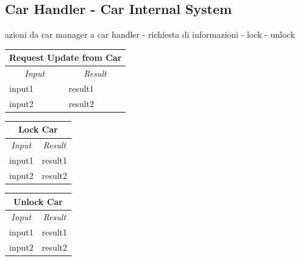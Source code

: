 \documentclass[english]{article}
\begin{document}
\subsection{Car Handler - Car Internal System}
azioni da car manager a car handler
- richiesta di informazioni
- lock
- unlock

\begin{center}

	\begin{tabular}{ | p{6cm} | p{6cm} | }
		\hline 


		\hline

		\multicolumn{2}{|c|}{\textbf{Request Update from Car}} \\
		\hline
		\multicolumn{1}{|c|}{\textit{Input}} & \multicolumn{1}{c|}{\textit{Result}} \\
		\hline
		input1 & result1 \\
		\hline
		input2 & result2 \\
		\hline
	\end{tabular}
\end{center}

\begin{center}

	\begin{tabular}{ | p{6cm} | p{6cm} | }
		\hline 


		\hline

		\multicolumn{2}{|c|}{\textbf{Lock Car}} \\
		\hline
		\multicolumn{1}{|c|}{\textit{Input}} & \multicolumn{1}{c|}{\textit{Result}} \\
		\hline
		input1 & result1 \\
		\hline
		input2 & result2 \\
		\hline
	\end{tabular}
\end{center}

\begin{center}

	\begin{tabular}{ | p{6cm} | p{6cm} | }
		\hline 


		\hline

		\multicolumn{2}{|c|}{\textbf{Unlock Car}} \\
		\hline
		\multicolumn{1}{|c|}{\textit{Input}} & \multicolumn{1}{c|}{\textit{Result}} \\
		\hline
		input1 & result1 \\
		\hline
		input2 & result2 \\
		\hline
	\end{tabular}
\end{center}
\end{document}
